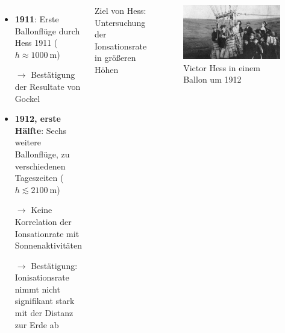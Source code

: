 \documentclass[aspectratio=1610, professionalfonts, 9pt, hyperref={colorlinks=false}]{beamer}
\begin{document}
\begin{frame}{}
  \begin{columns}
      \begin{itemize}
        \setlength\itemsep{0.5em}
        \item \textbf{1911}: Erste Ballonflüge durch Hess 1911 ($h \approx \SI{1000}{\metre}$)
        \item [$\rightarrow$] Bestätigung der Resultate von Gockel
        \item \textbf{1912, erste Hälfte}: Sechs weitere Ballonflüge, zu verschiedenen Tageszeiten ($h \lesssim \SI{2100}{\metre}$)
        \item [$\rightarrow$] Keine Korrelation der Ionsationrate mit Sonnenaktivitäten
        \item [$\rightarrow$] Bestätigung: Ionisationsrate nimmt nicht signifikant stark mit der Distanz zur Erde ab
      \end{itemize}
        \vspace*{10px}

    Ziel von Hess: Untersuchung der Ionsationsrate in größeren Höhen
  
      \begin{figure}
          \centering
          \includegraphics[width=\linewidth]{images/ballon.jpg}
          \caption{Victor Hess in einem Ballon um 1912 \cite{baloon}}
      \end{figure}
  \end{columns}
\end{frame}
\end{document}
